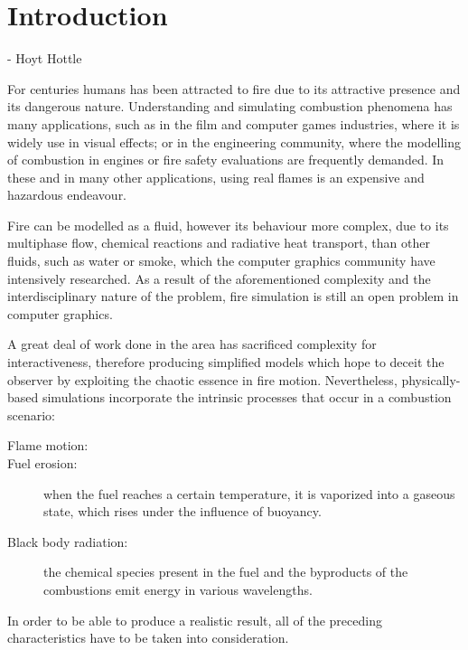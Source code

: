 \chapter{Introduction}
\label{ch:introduction}
 - Hoyt Hottle

For centuries humans has been attracted to fire due to its attractive presence and its dangerous nature.
Understanding and simulating combustion phenomena has many applications, such as in the film and computer games industries, where it is widely use in visual effects; or in the engineering community, where the modelling of combustion in engines or fire safety evaluations are frequently demanded.
In these and in many other applications, using real flames is an expensive and hazardous endeavour.

Fire can be modelled as a fluid, however its behaviour more complex, due to its multiphase flow, chemical reactions and radiative heat transport, than other fluids, such as water or smoke, which the computer graphics community have intensively researched.
As a result of the aforementioned complexity and the interdisciplinary nature of the problem, fire simulation is still an open problem in computer graphics.

A great deal of work done in the area has sacrificed complexity for interactiveness, therefore producing simplified models which hope to deceit the observer by exploiting the chaotic essence in fire motion.
Nevertheless, physically-based simulations incorporate the intrinsic processes that occur in a combustion scenario:

\begin{description}
\item[Flame motion:]
\item[Fuel erosion:] when the fuel reaches a certain temperature, it is vaporized into a gaseous state, which rises under the influence of buoyancy.
\item[Black body radiation:] the chemical species present in the fuel and the byproducts of the combustions emit energy in various wavelengths.
\end{description}

In order to be able to produce a realistic result, all of the preceding characteristics have to be taken into consideration.  
